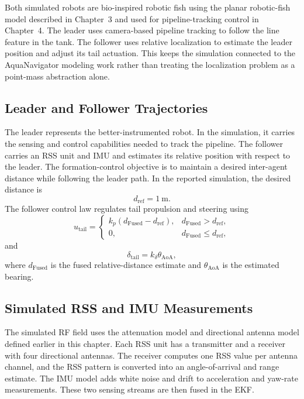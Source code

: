 \documentclass{uhcoethesis}
\begin{document}
Both simulated robots are bio-inspired robotic fish using the planar robotic-fish model described in Chapter~3 and used for pipeline-tracking control in Chapter~4. The leader uses camera-based pipeline tracking to follow the line feature in the tank. The follower uses relative localization to estimate the leader position and adjust its tail actuation. This keeps the simulation connected to the AquaNavigator modeling work rather than treating the localization problem as a point-mass abstraction alone.

\subsection{Leader and Follower Trajectories}

The leader represents the better-instrumented robot. In the simulation, it carries the sensing and control capabilities needed to track the pipeline. The follower carries an RSS unit and IMU and estimates its relative position with respect to the leader. The formation-control objective is to maintain a desired inter-agent distance while following the leader path. In the reported simulation, the desired distance is
\begin{equation}
    d_{\mathrm{ref}} = 1~\mathrm{m}.
    \label{eq:ch5_dref}
\end{equation}
The follower control law regulates tail propulsion and steering using
\begin{equation}
u_{\mathrm{tail}} =
\begin{cases}
k_p(d_{\mathrm{Fused}}-d_{\mathrm{ref}}), & d_{\mathrm{Fused}}>d_{\mathrm{ref}},\\
0, & d_{\mathrm{Fused}}\leq d_{\mathrm{ref}},
\end{cases}
\label{eq:ch5_tail_speed_control}
\end{equation}
and
\begin{equation}
    \delta_{\mathrm{tail}}=k_{\delta}\theta_{\mathrm{AoA}},
    \label{eq:ch5_tail_steering_control}
\end{equation}
where $d_{\mathrm{Fused}}$ is the fused relative-distance estimate and $\theta_{\mathrm{AoA}}$ is the estimated bearing.

\subsection{Simulated RSS and IMU Measurements}

The simulated RF field uses the attenuation model and directional antenna model defined earlier in this chapter. Each RSS unit has a transmitter and a receiver with four directional antennas. The receiver computes one RSS value per antenna channel, and the RSS pattern is converted into an angle-of-arrival and range estimate. The IMU model adds white noise and drift to acceleration and yaw-rate measurements. These two sensing streams are then fused in the EKF.
\end{document}

